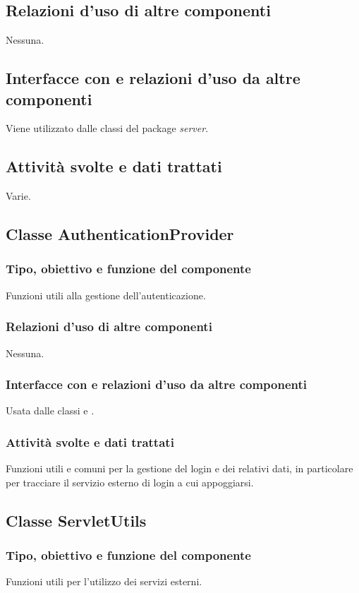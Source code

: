 \subsection*{Relazioni d'uso di altre componenti}
Nessuna.
\subsection*{Interfacce con e relazioni d'uso da altre componenti}
Viene utilizzato dalle classi del package \emph{server}.
\subsection*{Attivit\`a svolte e dati trattati}
Varie.

\subsection{Classe AuthenticationProvider}
\subsubsection*{Tipo, obiettivo e funzione del componente}
Funzioni utili alla gestione dell'autenticazione.
\subsubsection*{Relazioni d'uso di altre componenti}
Nessuna.
\subsubsection*{Interfacce con e relazioni d'uso da altre componenti}
Usata dalle classi  e . 
\subsubsection*{Attivit\`a svolte e dati trattati}
Funzioni utili e comuni per la gestione del login e dei relativi dati, in
particolare per tracciare il servizio esterno di login a cui appoggiarsi.

\subsection{Classe ServletUtils}
\subsubsection*{Tipo, obiettivo e funzione del componente}
Funzioni utili per l'utilizzo dei servizi esterni.
